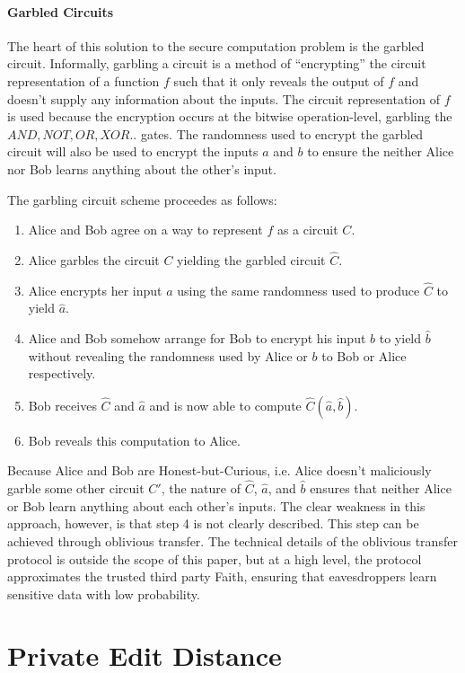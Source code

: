\paragraph{Garbled Circuits}
The heart of this solution to the secure computation problem is the garbled circuit. Informally, garbling a circuit is a method of ``encrypting'' the circuit representation of a function $f$ such that it only reveals the output of $f$ and doesn't supply any information about the inputs. The circuit representation of $f$ is used because the encryption occurs at the bitwise operation-level, garbling the $AND, NOT, OR, XOR..$ gates. The randomness used to encrypt the garbled circuit will also be used to encrypt the inputs $a$ and $b$ to ensure the neither Alice nor Bob learns anything about the other's input.

The garbling circuit scheme proceedes as follows:
\begin{enumerate}
\item Alice and Bob agree on a way to represent $f$ as a circuit $C$.
\item Alice garbles the circuit $C$ yielding the garbled circuit $\hat{C}$.
\item Alice encrypts her input $a$ using the same randomness used to produce $\hat{C}$ to yield $\hat{a}$.
\item Alice and Bob somehow arrange for Bob to encrypt his input $b$ to yield $\hat{b}$ without revealing the randomness used by Alice or $b$ to Bob or Alice respectively.
\item Bob receives $\hat{C}$ and $\hat{a}$ and is now able to compute $\hat{C}(\hat{a}, \hat{b})$.
\item Bob reveals this computation to Alice.
\end{enumerate}
Because Alice and Bob are Honest-but-Curious, i.e. Alice doesn't maliciously garble some other circuit $C'$, the nature of $\hat{C}$, $\hat{a}$, and $\hat{b}$ ensures that neither Alice or Bob learn anything about each other's inputs. The clear weakness in this approach, however, is that step 4 is not clearly described. This step can be achieved through oblivious transfer. The technical details of the oblivious transfer protocol is outside the scope of this paper, but at a high level, the protocol approximates the trusted third party Faith, ensuring that eavesdroppers learn sensitive data with low probability.

\pagebreak
\section{Private Edit Distance}

